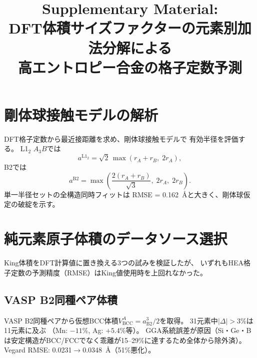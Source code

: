 \documentclass[5p,10pt]{elsarticle}
\begin{document}
\begin{frontmatter}
\title{Supplementary Material:\\
DFT体積サイズファクターの元素別加法分解による\\
高エントロピー合金の格子定数予測}
\end{frontmatter}


\section{剛体球接触モデルの解析}
\label{sec:appendix_packing}

DFT格子定数から最近接距離を求め、剛体球接触モデルで
有効半径を評価する。
L1$_2$ $A_3B$では
\begin{equation}
  a^{\text{L1}_2} = \sqrt{2}\,\max(r_A + r_B,\; 2r_A),
  \label{eq:dnn_l12}
\end{equation}
B2では
\begin{equation}
  a^{\text{B2}} = \max\!\left(\frac{2(r_A + r_B)}{\sqrt{3}},\;
    2r_A,\; 2r_B\right)\!.
  \label{eq:dnn_b2}
\end{equation}
単一半径セットの全構造同時フィットは
RMSE = 0.162~\AA{}と大きく、剛体球仮定の破綻を示す。


\section{純元素原子体積のデータソース選択}
\label{sec:appendix_volumes}

King体積をDFT計算値に置き換える3つの試みを検証したが、
いずれもHEA格子定数の予測精度（RMSE）はKing値使用時を上回れなかった。

\subsection{VASP B2同種ペア体積}
\label{sec:appendix_vasp_homo}

VASP B2同種ペアから仮想BCC体積$V^A_\text{BCC} = a^3_\text{B2}/2$を取得。
31元素中$|\Delta| > 3$\%は11元素に及ぶ
（Mn: $-11$\%, Ag: $+5.4$\%等）。
GGA系統誤差が原因（Si・Ge・Bは安定構造がBCC/FCCでなく乖離が15--29\%に達するため全体から除外済）。
Vegard RMSE: 0.0231$\to$0.0348~\AA{}（51\%悪化）。
\end{document}

